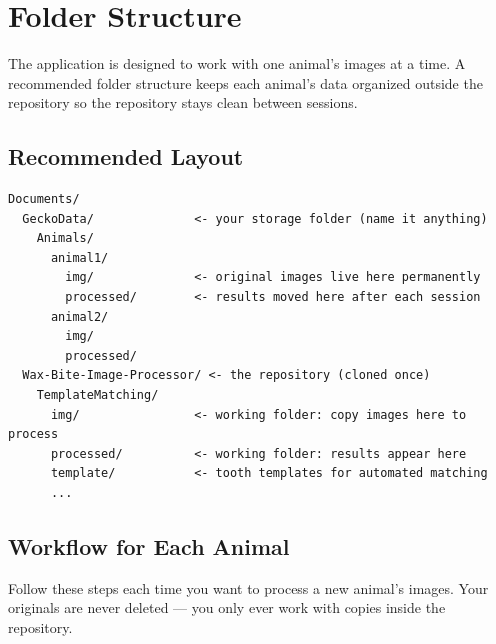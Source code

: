 \documentclass[11pt, letterpaper]{article}
\begin{document}
\section{Folder Structure}

The application is designed to work with one animal's images at a time. A recommended folder
structure keeps each animal's data organized outside the repository so the repository stays clean
between sessions.

\subsection*{Recommended Layout}

\begin{lstlisting}
Documents/
  GeckoData/              <- your storage folder (name it anything)
    Animals/
      animal1/
        img/              <- original images live here permanently
        processed/        <- results moved here after each session
      animal2/
        img/
        processed/
  Wax-Bite-Image-Processor/ <- the repository (cloned once)
    TemplateMatching/
      img/                <- working folder: copy images here to process
      processed/          <- working folder: results appear here
      template/           <- tooth templates for automated matching
      ...
\end{lstlisting}

\subsection*{Workflow for Each Animal}

Follow these steps each time you want to process a new animal's images. Your originals are
never deleted --- you only ever work with copies inside the repository.
\end{document}
